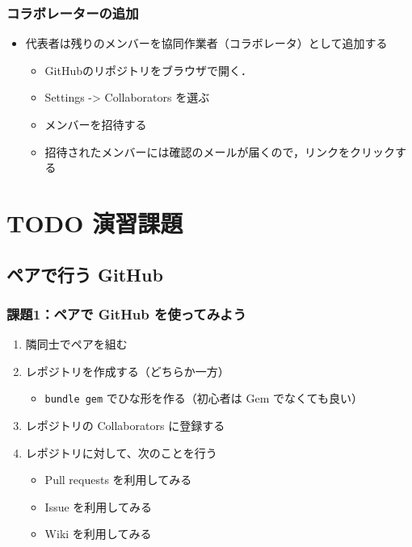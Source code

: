 \documentclass[a4paper,twoside,twocolumn]{bxjsarticle}
\begin{document}
\subsubsection{コラボレーターの追加}
\label{sec-3-1-2}
\begin{itemize}
\item 代表者は残りのメンバーを協同作業者（コラボレータ）として追加する
\begin{itemize}
\item GitHubのリポジトリをブラウザで開く．
\item Settings -> Collaborators を選ぶ
\item メンバーを招待する
\item 招待されたメンバーには確認のメールが届くので，リンクをクリックする
\end{itemize}
\end{itemize}

\section{{\bfseries\sffamily TODO} 演習課題}
\label{sec-4}
\subsection{ペアで行う GitHub}
\label{sec-4-1}
\subsubsection{課題1：ペアで GitHub を使ってみよう}
\label{sec-4-1-1}
\begin{enumerate}
\item 隣同士でペアを組む
\item レポジトリを作成する（どちらか一方）
\begin{itemize}
\item \texttt{bundle gem} でひな形を作る（初心者は Gem でなくても良い）
\end{itemize}
\item レポジトリの Collaborators に登録する
\item レポジトリに対して、次のことを行う
\begin{itemize}
\item Pull requests を利用してみる
\item Issue を利用してみる
\item Wiki を利用してみる
\end{itemize}
\end{enumerate}
\end{document}
